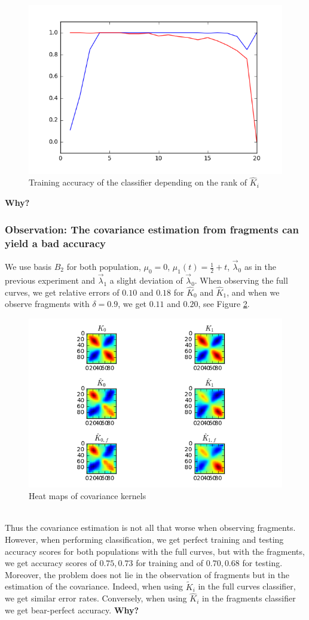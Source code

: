 \documentclass[10pt, a4paper]{article}
\theoremstyle{remark}
\begin{document}
\begin{figure}[h]
\centering
\includegraphics[width=0.7\linewidth]{Code/report_images/accu-rank}
\caption{Training accuracy of the classifier depending on the rank of $\hat{K}_i$}
\label{fig:accu-rank}
\end{figure}
\textbf{Why?}

\subsubsection*{Observation: The covariance estimation from fragments can yield a bad accuracy}
We use basis $B_2$ for both population, $\mu_0=0$, $\mu_1(t)=\frac{1}{2} + t$, $\vec{\lambda}_0$ as in the previous experiment and $\vec{\lambda}_1$ a slight deviation of $\vec{\lambda}_0$. When observing the full curves, we get relative errors of $0.10$ and  $0.18$ for $\hat{K}_0$ and $\hat{K}_1$, and when we observe fragments with $\delta=0.9$, we get $0.11$ and $0.20$, see Figure \ref{fig:covs}. 
\begin{figure}
\centering
\includegraphics[width=0.7\linewidth]{Code/report_images/covs}
\caption{Heat maps of covariance kernels}
\label{fig:covs}
\end{figure}\\
Thus the covariance estimation is not all that worse when observing fragments. However, when performing classification, we get perfect training and testing accuracy scores for both populations with the full curves, but with the fragments, we get accuracy scores of $0.75, 0.73$ for training and of $0.70, 0.68$ for testing. Moreover, the problem does not lie in the observation of fragments but in the estimation of the covariance. Indeed, when using $\tilde{K}_i$ in the full curves classifier, we get similar error rates. Conversely, when using $\hat{K}_i$ in the fragments classifier we get bear-perfect accuracy. \textbf{Why?}
\end{document}
